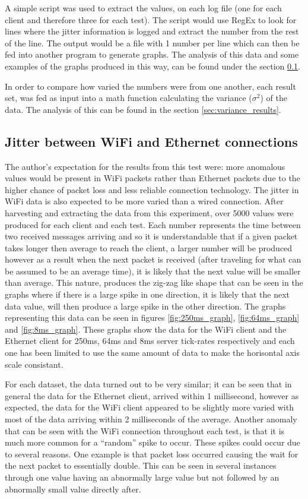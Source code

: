 A simple script was used to extract the values, on each log file (one for each client and therefore three for each test). The script would use RegEx to look for lines where the jitter information is logged and extract the number from the rest of the line. The output would be a file with 1 number per line which can then be fed into another program to generate graphs. The analysis of this data and some examples of the graphs produced in this way, can be found under the section \ref{sec:jitter_results}.

In order to compare how varied the numbers were from one another, each result set, was fed as input into a math function calculating the variance ($\sigma^2$) of the data. The analysis of this can be found in the section \ref{sec:variance_results}.

\newpage
\subsection{Jitter between WiFi and Ethernet connections} \label{sec:jitter_results}
The author's expectation for the results from this test were: more anomalous values would be present in WiFi packets rather than Ethernet packets due to the higher chance of packet loss and less reliable connection technology. The jitter in WiFi data is also expected to be more varied than a wired connection.
After harvesting and extracting the data from this experiment, over 5000 values were produced for each client and each test. Each number represents the time between two received messages arriving and so it is understandable that if a given packet takes longer then average to reach the client, a larger number will be produced however as a result when the next packet is received (after traveling for what can be assumed to be an average time), it is likely that the next value will be smaller than average. This nature, produces the zig-zag like shape that can be seen in the graphs where if there is a large spike in one direction, it is likely that the next data value, will then produce a large spike in the other direction. The graphs representing this data can be seen in figures \ref{fig:250ms_graph}, \ref{fig:64ms_graph} and \ref{fig:8ms_graph}. These graphs show the data for the WiFi client and the Ethernet client for 250ms, 64ms and 8ms server tick-rates respectively and each one has been limited to use the same amount of data to make the horisontal axis scale consistant.

For each dataset, the data turned out to be very similar; it can be seen that in general the data for the Ethernet client, arrived within 1 millisecond, however as expected, the data for the WiFi client appeared to be slightly more varied with most of the data arriving within 2 milliseconds of the average. Another anomaly that can be seen with the WiFi connection throughout each test, is that it is much more common for a ``random'' spike to occur. These spikes could occur due to several reasons. One example is that packet loss occurred causing the wait for the next packet to essentially double. This can be seen in several instances through one value having an abnormally large value but not followed by an abnormally small value directly after.

